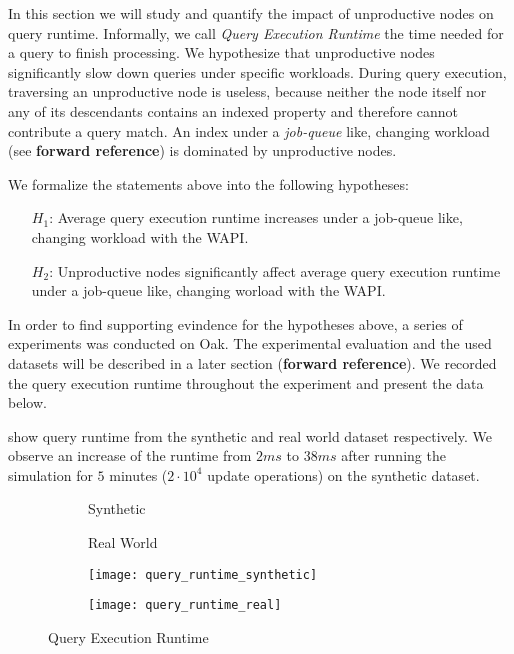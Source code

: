 \documentclass[abstracton,12pt]{scrartcl}
\theoremstyle{definition}
\begin{document}
In this section we will study and quantify the impact of unproductive nodes on
query runtime. Informally, we call \textit{Query Execution Runtime} the time
needed for a query to finish processing. We hypothesize that unproductive nodes
significantly slow down queries under specific workloads. During query
execution, traversing an unproductive node is
useless, because neither the node itself nor any of its descendants contains
an indexed property and therefore cannot contribute a query match.
An index under a \textit{job-queue} like,
changing workload (see \textbf{forward reference}) is dominated by unproductive nodes.

We formalize the statements above into the following hypotheses:

\begin{shaded}
  \begin{itemize}
  \item[$H_1$:] Average query execution runtime increases under a job-queue
    like, changing workload with the WAPI.
  \item[$H_2$:] Unproductive nodes significantly affect average query execution
    runtime under a job-queue like, changing worload with the WAPI.
  \end{itemize}
\end{shaded}

In order to find supporting evindence for the hypotheses above, a series of
experiments was conducted on Oak. The experimental evaluation and the used
datasets will be described in a later section (\textbf{forward reference}). We
recorded  the query execution runtime throughout the experiment and present the data below.

 show 
query runtime from the synthetic and real world dataset respectively. 
We observe an increase of the runtime from $2 ms$ to $38 ms$
after running the simulation for $5$ minutes ($2 \cdot 10^4$ update operations)
on the synthetic dataset.

\begin{figure}[h]
  \centering
  \begin{subfigure}{0.49\linewidth}
    \centering
    Synthetic
  \end{subfigure}
  \begin{subfigure}{0.49\linewidth}
    \centering
    Real World
  \end{subfigure}
  \begin{subfigure}{0.49\linewidth}
    \centering
    \texttt{[image: query\_runtime\_synthetic]}
    \caption{}
    \label{fig:query_runtime_synthetic}
  \end{subfigure}
  \begin{subfigure}{0.49\linewidth}
    \centering
    \texttt{[image: query\_runtime\_real]}
    \caption{}
    \label{fig:query_runtime_real}
  \end{subfigure}
  \caption{Query Execution Runtime}
  \label{fig:query_runtime}
\end{figure}
\end{document}
